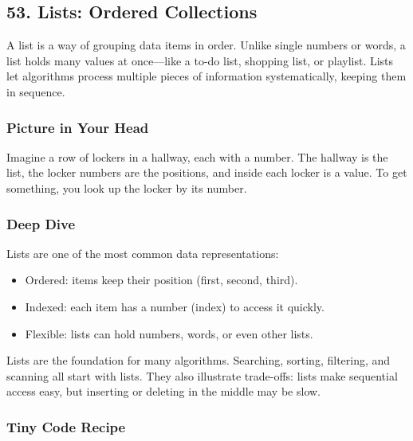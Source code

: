 \documentclass[
  letterpaper,
  DIV=11,
  numbers=noendperiod]{scrreprt}
\providecommand{\tightlist}{%
  \setlength{\itemsep}{0pt}\setlength{\parskip}{0pt}}
\begin{document}
\subsection{53. Lists: Ordered
Collections}\label{lists-ordered-collections}

A list is a way of grouping data items in order. Unlike single numbers
or words, a list holds many values at once---like a to-do list, shopping
list, or playlist. Lists let algorithms process multiple pieces of
information systematically, keeping them in sequence.

\subsubsection{Picture in Your Head}\label{picture-in-your-head-52}

Imagine a row of lockers in a hallway, each with a number. The hallway
is the list, the locker numbers are the positions, and inside each
locker is a value. To get something, you look up the locker by its
number.

\subsubsection{Deep Dive}\label{deep-dive-22}

Lists are one of the most common data representations:

\begin{itemize}
\tightlist
\item
  Ordered: items keep their position (first, second, third).
\item
  Indexed: each item has a number (index) to access it quickly.
\item
  Flexible: lists can hold numbers, words, or even other lists.
\end{itemize}

Lists are the foundation for many algorithms. Searching, sorting,
filtering, and scanning all start with lists. They also illustrate
trade-offs: lists make sequential access easy, but inserting or deleting
in the middle may be slow.

\subsubsection{Tiny Code Recipe}\label{tiny-code-recipe-50}
\end{document}
